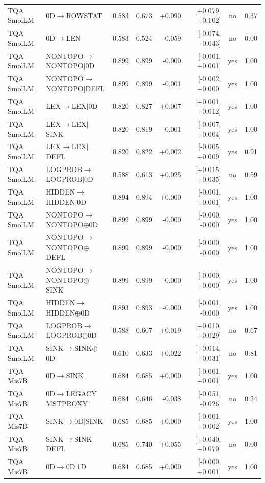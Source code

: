 \begin{longtable}{llrrrrcc}
TQA SmolLM & 0D$\to$ROWSTAT & 0.583 & 0.673 & +0.090 & [+0.079, +0.102] & no & 0.37 \\
TQA SmolLM & 0D$\to$LEN & 0.583 & 0.524 & -0.059 & [-0.074, -0.043] & no & 0.00 \\
TQA SmolLM & NONTOPO$\to$NONTOPO$\mid$0D & 0.899 & 0.899 & -0.000 & [-0.001, +0.001] & yes & 1.00 \\
TQA SmolLM & NONTOPO$\to$NONTOPO$\mid$DEFL & 0.899 & 0.899 & -0.001 & [-0.002, +0.000] & yes & 1.00 \\
TQA SmolLM & LEX$\to$LEX$\mid$0D & 0.820 & 0.827 & +0.007 & [+0.001, +0.012] & yes & 1.00 \\
TQA SmolLM & LEX$\to$LEX$\mid$SINK & 0.820 & 0.819 & -0.001 & [-0.007, +0.004] & yes & 1.00 \\
TQA SmolLM & LEX$\to$LEX$\mid$DEFL & 0.820 & 0.822 & +0.002 & [-0.005, +0.009] & yes & 0.91 \\
TQA SmolLM & LOGPROB$\to$LOGPROB$\mid$0D & 0.588 & 0.613 & +0.025 & [+0.015, +0.035] & no & 0.59 \\
TQA SmolLM & HIDDEN$\to$HIDDEN$\mid$0D & 0.894 & 0.894 & +0.000 & [-0.001, +0.001] & yes & 1.00 \\
TQA SmolLM & NONTOPO$\to$NONTOPO$\oplus$0D & 0.899 & 0.899 & -0.000 & [-0.000, -0.000] & yes & 1.00 \\
TQA SmolLM & NONTOPO$\to$NONTOPO$\oplus$DEFL & 0.899 & 0.899 & -0.000 & [-0.000, -0.000] & yes & 1.00 \\
TQA SmolLM & NONTOPO$\to$NONTOPO$\oplus$SINK & 0.899 & 0.899 & -0.000 & [-0.000, +0.000] & yes & 1.00 \\
TQA SmolLM & HIDDEN$\to$HIDDEN$\oplus$0D & 0.893 & 0.893 & -0.000 & [-0.001, -0.000] & yes & 1.00 \\
TQA SmolLM & LOGPROB$\to$LOGPROB$\oplus$0D & 0.588 & 0.607 & +0.019 & [+0.010, +0.029] & no & 0.67 \\
TQA SmolLM & SINK$\to$SINK$\oplus$0D & 0.610 & 0.633 & +0.022 & [+0.014, +0.031] & no & 0.81 \\
TQA Mis7B & 0D$\to$SINK & 0.684 & 0.685 & +0.000 & [-0.001, +0.001] & yes & 1.00 \\
TQA Mis7B & 0D$\to$LEGACY MSTPROXY & 0.684 & 0.646 & -0.038 & [-0.051, -0.026] & no & 0.24 \\
TQA Mis7B & SINK$\to$0D$\mid$SINK & 0.685 & 0.685 & +0.000 & [-0.001, +0.002] & yes & 1.00 \\
TQA Mis7B & SINK$\to$SINK$\mid$DEFL & 0.685 & 0.740 & +0.055 & [+0.040, +0.070] & no & 0.00 \\
TQA Mis7B & 0D$\to$0D$\mid$1D & 0.684 & 0.685 & +0.000 & [-0.000, +0.001] & yes & 1.00 \\

\end{longtable}
